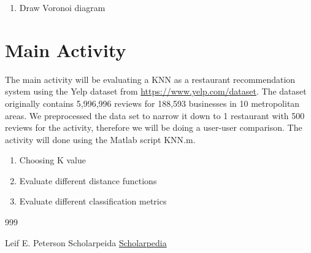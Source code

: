 \documentclass{report}
\begin{document}
\begin{enumerate}



\item Draw Voronoi diagram
\end{enumerate}

\section*{Main Activity}

The main activity will be evaluating a KNN as a restaurant recommendation system using the Yelp dataset from \href{https://www.yelp.com/dataset}{https://www.yelp.com/dataset}.
The dataset originally contains 5,996,996 reviews for 188,593 businesses in 10 metropolitan areas.
We preprocessed the data set to narrow it down to 1 restaurant with 500 reviews for the activity, therefore we will be doing a user-user comparison.  
The activity will done using the Matlab script KNN.m.

\begin{enumerate}

\item Choosing K value

\item Evaluate different distance functions

\item Evaluate different classification metrics

\end{enumerate}

\begin {thebibliography}{999}

	Leif E. Peterson
	Scholarpeida
	\href{http://www.scholarpedia.org/article/K-nearest_neighbor}{Scholarpedia}
	
\end{thebibliography}
\end{document}
